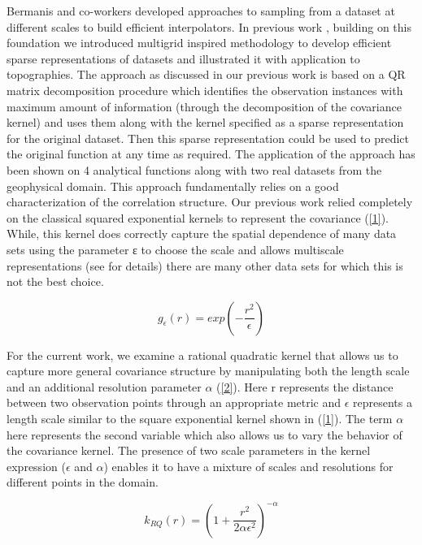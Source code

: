 \documentclass[procedia]{easychair}
\begin{document}
Bermanis and co-workers \cite{bermanis2013multiscale} developed approaches to sampling from a dataset at different scales to build efficient interpolators. In previous work \cite{patra2016multilevel}, building on this foundation we introduced multigrid inspired methodology to develop efficient sparse representations of datasets and illustrated it with application to topographies. The approach as discussed in our previous work \cite{patra2016multilevel} is based on a QR matrix decomposition procedure which identifies the observation instances with maximum amount of information (through the decomposition of the covariance kernel) and uses them along with the kernel specified as a sparse representation for the original dataset. Then this sparse representation could be used to predict the original function at any time as required. The application of the approach has been shown on 4 analytical functions along with two real datasets from the geophysical domain.
This approach fundamentally relies on a good characterization of the correlation structure. Our previous work relied completely on the classical squared exponential kernels to represent the covariance (\ref{1}). While, this kernel does correctly capture the spatial dependence of many data sets using the parameter ε to choose the scale and allows multiscale representations (see \cite{rasmussen2006gaussian} for details) there are many other data sets for which this is not the best choice.


\begin{equation}
g_\epsilon (r) = exp\left({-\frac{r^2}{\epsilon}}\right)
\label{1}
\end{equation}

For the current work, we examine a rational quadratic kernel that allows us to capture more general covariance structure by manipulating both the length scale and an additional resolution parameter $\alpha$ (\ref{2}). Here r represents the distance between two observation points through an appropriate metric and $\epsilon$ represents a length scale similar to the square exponential kernel shown in (\ref{1}). The term $\alpha$ here represents the second variable which also allows us to vary the behavior of the covariance kernel. The presence of two scale parameters in the kernel expression ($\epsilon$ and $\alpha$) enables it to have a mixture of scales and resolutions for different points in the domain.


\begin{equation}
k_{RQ}(r) = \left({1 + \frac{r^2}{2 \alpha \epsilon^2}}\right)^{-\alpha}
\label{2}
\end{equation}
\end{document}
